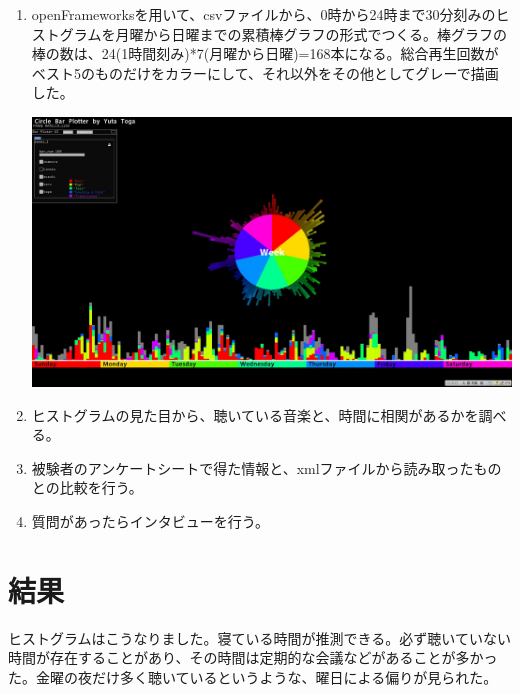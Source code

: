 \documentclass{jsarticle}
\begin{document}
\begin{enumerate}
\item
openFrameworksを用いて、csvファイルから、0時から24時まで30分刻みのヒストグラムを月曜から日曜までの累積棒グラフの形式でつくる。棒グラフの棒の数は、24(1時間刻み)*7(月曜から日曜)=168本になる。総合再生回数がベスト5のものだけをカラーにして、それ以外をその他としてグレーで描画した。

\begin{center}
\includegraphics[width=14cm]{graph_sample.jpg}
\end{center}

\item
ヒストグラムの見た目から、聴いている音楽と、時間に相関があるかを調べる。

\item
被験者のアンケートシートで得た情報と、xmlファイルから読み取ったものとの比較を行う。

\item
質問があったらインタビューを行う。

\end{enumerate}

\section{結果}
ヒストグラムはこうなりました。寝ている時間が推測できる。必ず聴いていない時間が存在することがあり、その時間は定期的な会議などがあることが多かった。金曜の夜だけ多く聴いているというような、曜日による偏りが見られた。
\end{document}
